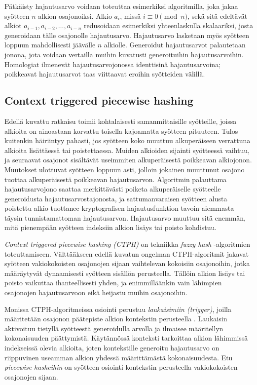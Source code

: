 \documentclass[10pt]{article}
\begin{document}
	Pätkäisty hajautusarvo voidaan toteuttaa esimerkiksi
	algoritmilla, joka jakaa syötteen $n$ alkion osajonoiksi.
	Alkio $a_i$, missä $i \equiv 0 \pmod{n}$, sekä sitä
	edeltävät alkiot $a_{i - 1}, a_{i - 2}, \ldots, a_{i - n}$
	redusoidaan esimerkiksi yhteenlaskulla skalaariksi, josta generoidaan
	tälle osajonolle hajautusarvo. Hajautusarvo lasketaan myös syötteen
	loppuun mahdollisesti jäävälle $n$ alkiolle. Generoidut hajautusarvot
	palautetaan jonona, jota voidaan vertailla
	muihin kuvatusti generoituihin hajautusarvoihin. Homologiat
	ilmenevät hajautusarvojonossa identtisinä hajautusarvoina; poikkeavat
	hajautusarvot taas viittaavat eroihin syötteiden välillä.

	\subsection*{Context triggered piecewise hashing}

	Edellä kuvattu ratkaisu toimii kohtalaisesti samanmittaisille
	syötteille, joissa alkioita on ainoastaan korvattu toisella
	kajoamatta syötteen pituuteen.
	Tulos kuitenkin häiriintyy pahasti, jos
	syötteen koko muuttuu alkuperäiseen verrattuna alkioita
	lisättäessä tai poistettaessa. Muiden alkioiden
	sijainti syötteessä vaihtuu, ja seuraavat osajonot sisältävät
	useimmiten alkuperäisestä poikkeavan alkiojonon.
	Muutokset ulottuvat syötteen loppuun asti, jolloin
	jokainen muuttunut osajono tuottaa alkuperäisestä
	poikkeavan hajautusarvon. Algoritmin palauttama hajautusarvojono
	saattaa merkittävästi poiketa alkuperäiselle syötteelle
	generoidusta hajautusarvostajonosta, ja sattumanvaraisen syötteen
	alusta poistettu alkio tuottanee kryptografisen hajautusfunktion
	tavoin aiemmasta täysin tunnistamattoman hajautusarvon.
	Hajautusarvo muuttuu sitä enemmän, mitä pienempään syötteen
	indeksiin alkion lisäys tai poisto kohdistuu.

	\textit{Context triggered piecewise hashing (CTPH)} on tekniikka
	\textit{fuzzy hash} -algoritmien toteuttamiseen. Välttääkseen edellä kuvatun ongelman
	CTPH-algoritmit jakavat syötteen vakiokokoisten osajonojen
	sijaan vaihtelevan kokoisiin osajonoihin, jotka määräytyvät dynaamisesti
	syötteen sisällön perusteella. Tällöin alkion lisäys tai poisto vaikuttaa
	ihanteellisesti yhden, ja enimmilläänkin vain lähimpien osajonojen
	hajautusarvoon eikä heijastu muihin osajonoihin.

	Monissa CTPH-algoritmeissa osiointi perustuu \textit{laukaisimiin (trigger)},
	joilla määritetään osajonon päätepiste alkion kontekstin perusteella \parencite{IDENT}. Laukaisin
	aktivoituu tietyllä syötteestä generoidulla arvolla ja ilmaisee
	määritellyn kokonaisuuden päättymistä. Käytännössä konteksti tarkoittaa
	alkion lähimmissä indekseissä olevia alkioita, joten kontekstille generoitu 
	hajautusarvo on riippuvinen useamman alkion yhdessä määrittämästä kokonaisuudesta.
	Etu \textit{piecewise hasheihin} on syötteen osiointi
	kontekstin perusteella vakiokokoisten osajonojen sijaan.
\end{document}
